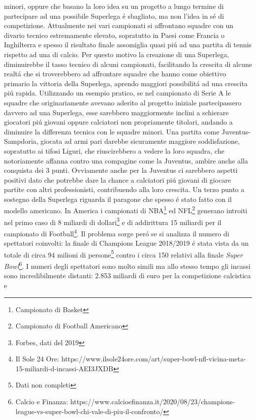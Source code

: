 \documentclass[
    corpo=12pt,
    oneside,
    evenboxes,
    tipotesi=triennale,
    stile=classica,
    oldstyle,
    autoretitolo,
    greek,
]{toptesi}
\begin{document}
\begin{interlinea}{1.5}
minori, oppure che basano la loro idea su un progetto a lungo termine di partecipare ad una possibile Superlega \'e sbagliato, 
ma non l'idea in s\'e di competizione. Attualmente nei vari campionati si affrontano squadre con un divario tecnico estremamente elevato, 
sopratutto in Paesi come Francia o Inghilterra e spesso il risultato finale assomiglia quasi pi\'u ad una partita di tennis rispetto ad una
di calcio. Per questo motivo la creazione di una Superlega, diminuirebbe il tasso tecnico di alcuni campionati, facilitando la crescita di alcune realt\'a 
che si troverebbero ad affrontare squadre che hanno come obiettivo primario la vittoria della Superlega,
aprendo maggiori possibilit\'a ad una crescita pi\'u rapida. Utilizzando un esempio pratico, se nel campionato di Serie A le squadre che \linebreak originariamente avevano
aderito al progetto iniziale partecipassero davvero ad una Superlega, esse sarebbero maggiormente inclini a schierare giocatori pi\'u giovani oppure
calciatori non propriamente titolari, andando a diminuire la differenza tecnica con le squadre minori. Una partita come Juventus-Sampdoria, giocata
ad armi pari darebbe sicuramente maggiore soddisfazione, sopratutto ai tifosi Liguri, che riuscirebbero a vedere la loro squadra, che notoriamente
affanna contro una compagine come la Juventus, ambire anche alla conquista dei 3 punti. Ovviamente anche per la Juventus ci sarebbero
aspetti positivi dato che potrebbe dare la chance a calciatori pi\'u giovani di giocare partite con altri professionisti, contribuendo alla loro 
crescita.
Un terzo punto a sostegno della Superlega riguarda il paragone che spesso \'e stato fatto con il modello americano. In America i campionati di NBA\footnote{Campionato di Basket}
ed NFL\footnote{Campionato di Football Americano} generano introiti nel primo caso di 8 miliardi di dollari\footnote{Forbes, dati del 2019} e di addirittura
15 miliardi per il campionato di Football\footnote{Il Sole 24 Ore: https://www.ilsole24ore.com/art/super-bowl-nfl-vicina-meta-15-miliardi-d-incassi-AEI3JXDB}.
Il problema sorge per\'o se si analizza il numero di spettatori coinvolti: la finale di Champions League 2018/2019 \'e stata vista da un totale di 
circa 94 milioni di persone\footnote{Dati non completi} contro i circa 150 relativi alla finale \emph{Super Bowl}\footnote{Calcio e Finanza: https://www.calcioefinanza.it/2020/08/23/champions-league-vs-super-bowl-chi-vale-di-piu-il-confronto/}. 
I numeri degli spettatori sono molto simili ma allo stesso tempo gli incassi sono incredibilmente distanti: 2.853 miliardi di euro per la competizione calcistica e 

\end{interlinea}
\end{document}
